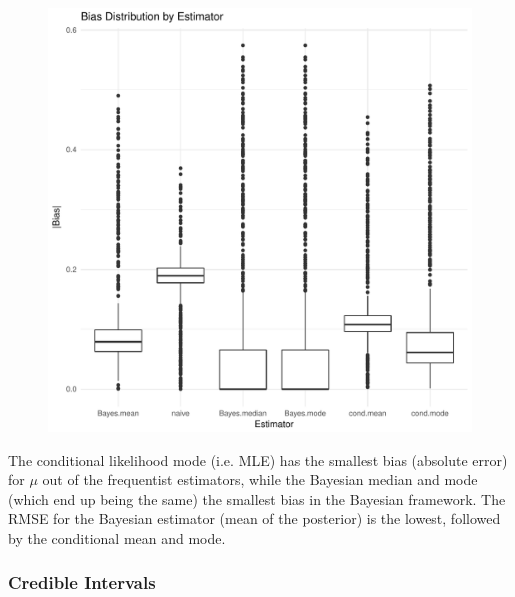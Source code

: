 \documentclass[AMA,STIX1COL]{WileyNJD-v2}\usepackage[]{graphicx}\usepackage[]{color}
\makeatletter
\def\maxwidth{ %
  \ifdim\Gin@nat@width>\linewidth
    \linewidth
  \else
    \Gin@nat@width
  \fi
}
\newenvironment{knitrout}{}{} %
\makeatother
\begin{document}
\begin{figure}
\begin{knitrout}
\color{fgcolor}
\includegraphics[width=\maxwidth]{figure/unnamed-chunk-12-1} 

\end{knitrout}
\end{figure}

The conditional likelihood mode (i.e. MLE) has the smallest bias (absolute error) for $\mu$ out of the frequentist estimators, while the Bayesian median and mode (which end up being the same) the smallest bias in the Bayesian framework. The RMSE for the Bayesian estimator (mean of the posterior) is the lowest, followed by the conditional mean and mode.

\subsubsection{Credible Intervals}
\end{document}
